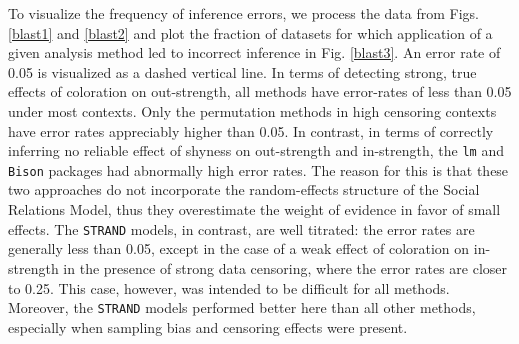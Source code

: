 \documentclass[Afour,sageh,times]{sagej}
\begin{document}
To visualize the frequency of inference errors, we process the data from Figs. \ref{blast1} and \ref{blast2} and plot the fraction of datasets for which application of a given analysis method led to incorrect inference in Fig. \ref{blast3}. An error rate of 0.05 is visualized as a dashed vertical line. In terms of detecting strong, true effects of coloration on out-strength, all methods have error-rates of less than 0.05 under most contexts. Only the permutation methods in high censoring contexts have error rates appreciably higher than 0.05. In contrast, in terms of correctly inferring no reliable effect of shyness on out-strength and in-strength, the \texttt{lm} and \texttt{Bison} packages had abnormally high error rates. The reason for this is that these two approaches do not incorporate the random-effects structure of the Social Relations Model, thus they overestimate the weight of evidence in favor of small effects. The \texttt{STRAND} models, in contrast, are well titrated: the error rates are generally less than 0.05, except in the case of a weak effect of coloration on in-strength in the presence of strong data censoring, where the error rates are closer to 0.25. This case, however, was intended to be difficult for all methods. Moreover, the \texttt{STRAND} models performed better here than all other methods, especially when sampling bias and censoring effects were present.
\end{document}
